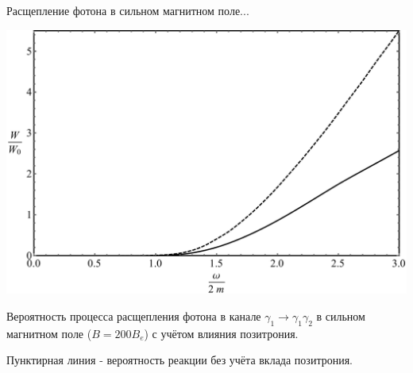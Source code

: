 \documentclass{beamer}
\begin{document}
\begin{frame}{Расщепление фотона в сильном магнитном поле...}
\begin{center}
\includegraphics[scale=0.28]{112.pdf}

Вероятность процесса расщепления фотона в канале $\gamma_1 \to\gamma_1 \gamma_2$ в сильном 
магнитном поле ($B=200 B_e$) с учётом влияния позитрония.

Пунктирная линия - вероятность реакции без учёта вклада позитрония.

\end{center}
\end{frame}
\end{document}
